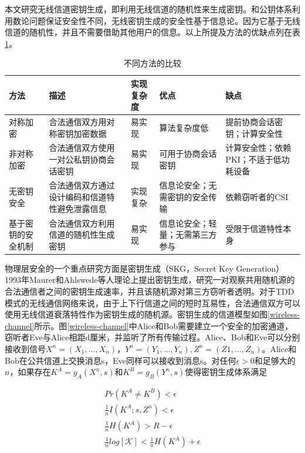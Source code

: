 \documentclass[master]{seuthesis} %
\begin{document}
\begin{Main}
本文研究无线信道密钥生成，即利用无线信道的随机性来生成密钥。和公钥体系利用数论问题保证安全性不同，无线密钥生成的安全性基于信息论。因为它基于无线信道的随机性\cite{ahlswede1993common}\cite{maurer1993secret}，并且不需要借助其他用户的信息。以上所提及方法的优缺点列在表\ref{comparison-different-schemes}。

\begin{table}[]
    \centering
    \begin{tabular}{|p{80pt}|p{90pt}|p{70pt}|p{90pt}|p{90pt}|}
    \hline
    方法 & 描述 & 实现复杂度 & 优点 & 缺点 \\ \hline
    对称加密 & 合法通信双方用对称密钥加密数据 & 易实现 & 算法复杂度低 & 提前协商会话密钥；计算安全性 \\ \hline
    非对称加密 & 合法通信双方使用一对公私钥协商会话密钥 & 易实现 & 可用于协商会话密钥 & 计算安全性；依赖PKI；不适于低功耗设备 \\ \hline
    无密钥安全 & 合法通信双方通过设计编码和信道特性避免泄露信息 & 实现复杂 & 信息论安全；无需密钥的安全传输 & 依赖窃听者的CSI \\ \hline
    基于密钥的安全机制 & 合法通信双方利用信道的随机性生成密钥 & 易实现 & 信息论安全；轻量；无需第三方参与 & 受限于信道特性本身 \\ \hline
    \end{tabular}

    \caption{不同方法的比较
    \label{comparison-different-schemes}}
\end{table}

物理层安全的一个重点研究方面是密钥生成（SKG，Secret Key Generation）1993年Maurer和Ahlswede等人理论上提出密钥生成\cite{ahlswede1993common}\cite{maurer1993secret}，研究一对观察共用随机源的合法通信者之间的密钥生成速率，并且该随机源对第三方窃听者透明。对于TDD模式的无线通信网络来说，由于上下行信道之间的短时互易性，合法通信双方可以使用无线信道衰落特性作为密钥生成的随机源。密钥生成的信道模型如图\ref{wireless-channel}所示。图\ref{wireless-channel}中Alice和Bob需要建立一个安全的加密通道，窃听者Eve与Alice相距d厘米，并监听了所有传输过程。Alice、Bob和Eve可以分别接收到信号$X^n = (X_1, ..., X_n)$，$Y^n = (Y_1, ..., Y_n), Z^n = (Z1, ..., Z_n)$。Alice和Bob在公共信道上交换消息s，Eve同样可以接收到消息s。对任何$\epsilon > 0$和足够大的$n$，如果存在$K^A = g_A(X^n, s)$和$K^B = g_B(Y^n, s)$使得密钥生成体系满足

\begin{eqnarray}
    Pr(K^A \neq K^B) < \epsilon \label{keyrate1} \\
    \frac{1}{n}I(K^A; s, Z^n) < \epsilon \label{keyrate2} \\
    \frac{1}{n}H(K^A) > R - \epsilon \label{keyrate3} \\
    \frac{1}{n}log[\mathcal{K}] < \frac{1}{n}H(K^A) + \epsilon \label{keyrate4}
\end{eqnarray}


\end{Main}
\end{document}
